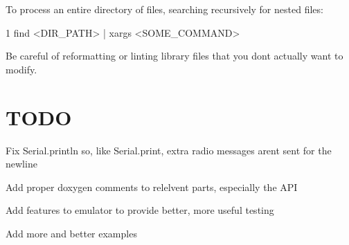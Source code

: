 To process an entire directory of files, searching recursively for nested files\+:


\begin{DoxyCode}
1 find <DIR\_PATH> | xargs <SOME\_COMMAND>
\end{DoxyCode}


Be careful of reformatting or linting library files that you don\textquotesingle{}t actually want to modify.

\section*{T\+O\+D\+O}


\begin{DoxyItemize}
\item Fix Serial.\+println so, like Serial.\+print, extra radio messages aren\textquotesingle{}t sent for the newline
\item Add proper doxygen comments to relelvent parts, especially the A\+P\+I
\item Add features to emulator to provide better, more useful testing
\item Add more and better examples 
\end{DoxyItemize}